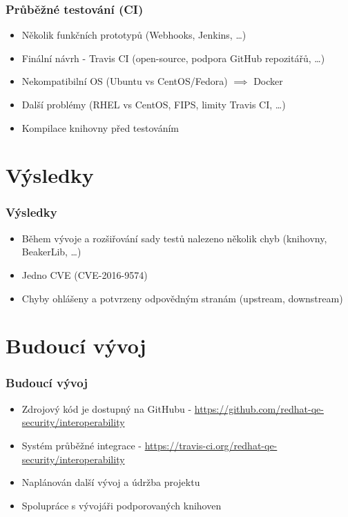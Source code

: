 \documentclass[10pt,xcolor=pdflatex]{beamer}
\begin{document}

\begin{frame}
\frametitle{Průběžné testování (CI)}
\begin{itemize}
    \item Několik funkčních prototypů (Webhooks, Jenkins, \dots)
    \item Finální návrh - Travis CI (open-source, podpora GitHub repozitářů, \dots)
    \item Nekompatibilní OS (Ubuntu vs CentOS/Fedora) $\implies$ Docker
    \item Další problémy (RHEL vs CentOS, FIPS, limity Travis CI, \dots)
    \item Kompilace knihovny před testováním
\end{itemize}
\end{frame}


\section{Výsledky}

\begin{frame}
\frametitle{Výsledky}
\begin{itemize}
    \item Během vývoje a rozšiřování sady testů nalezeno několik chyb (knihovny, BeakerLib, \dots)
    \item Jedno CVE (CVE-2016-9574)
    \item Chyby ohlášeny a potvrzeny odpovědným stranám (upstream, downstream)
\end{itemize}
\end{frame}


\section{Budoucí vývoj}

\begin{frame}
\frametitle{Budoucí vývoj}
\begin{itemize}
    \item Zdrojový kód je dostupný na GitHubu - \url{https://github.com/redhat-qe-security/interoperability}
    \item Systém průběžné integrace - \url{https://travis-ci.org/redhat-qe-security/interoperability}
    \item Naplánován další vývoj a údržba projektu
    \item Spolupráce s vývojáři podporovaných knihoven
\end{itemize}
\end{frame}
\end{document}
